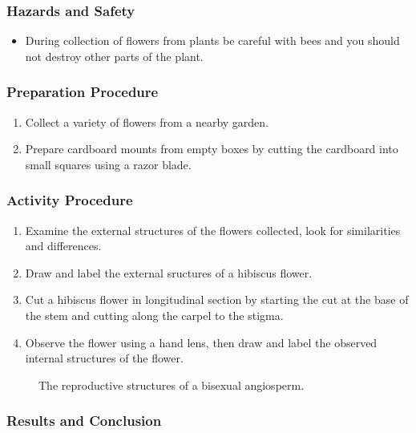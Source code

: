\subsubsection*{Hazards and Safety}
\begin{itemize}
\item{During collection of flowers from plants be careful with bees and you should not destroy other parts of the plant.}
\end{itemize}

\subsubsection*{Preparation Procedure}
\begin{enumerate}
\item{Collect a variety of flowers from a nearby garden.}
\item{Prepare cardboard mounts from empty boxes by cutting the cardboard into small squares using a razor blade.}
\end{enumerate}

\subsubsection*{Activity Procedure}
\begin{enumerate}
\item{Examine the external structures of the flowers collected, look for similarities and differences.}
\item{Draw and label the external sructures of a hibiscus flower.}
\item{Cut a hibiscus flower in longitudinal section by starting the cut at the base of the stem and cutting along the carpel to the stigma.}
\item{Observe the flower using a hand lens, then draw and label the observed internal structures of the flower.}
\end{enumerate}

\begin{figure}[h]
\begin{center}
\def\svgwidth{9cm}

\caption{The reproductive structures of a bisexual angiosperm.}
\label{fig:hibiscus}
\end{center}
\end{figure}

\subsubsection*{Results and Conclusion}


